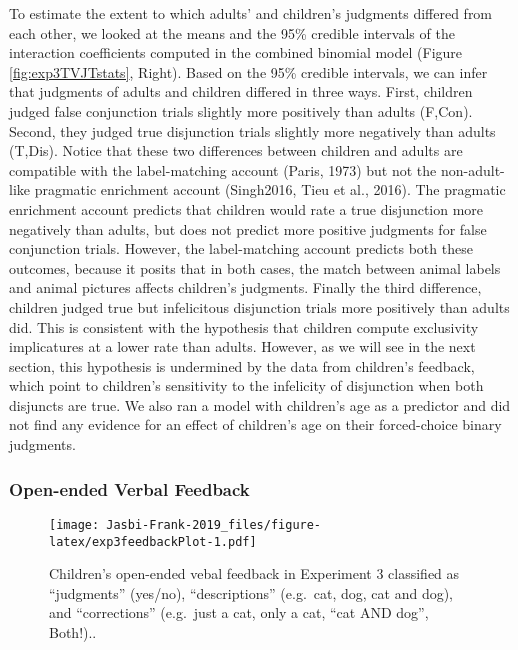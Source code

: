 \documentclass[,man,floatsintext]{apa6}
\begin{document}
To estimate the extent to which adults' and children's judgments differed from each other, we looked at the means and the 95\% credible intervals of the interaction coefficients computed in the combined binomial model (Figure \ref{fig:exp3TVJTstats}, Right). Based on the 95\% credible intervals, we can infer that judgments of adults and children differed in three ways. First, children judged false conjunction trials slightly more positively than adults (F,Con). Second, they judged true disjunction trials slightly more negatively than adults (T,Dis). Notice that these two differences between children and adults are compatible with the label-matching account (Paris, 1973) but not the non-adult-like pragmatic enrichment account (Singh2016, Tieu et al., 2016). The pragmatic enrichment account predicts that children would rate a true disjunction more negatively than adults, but does not predict more positive judgments for false conjunction trials. However, the label-matching account predicts both these outcomes, because it posits that in both cases, the match between animal labels and animal pictures affects children's judgments. Finally the third difference, children judged true but infelicitous disjunction trials more positively than adults did. This is consistent with the hypothesis that children compute exclusivity implicatures at a lower rate than adults. However, as we will see in the next section, this hypothesis is undermined by the data from children's feedback, which point to children's sensitivity to the infelicity of disjunction when both disjuncts are true. We also ran a model with children's age as a predictor and did not find any evidence for an effect of children's age on their forced-choice binary judgments.

\hypertarget{open-ended-verbal-feedback-1}{%
\subsubsection{Open-ended Verbal Feedback}\label{open-ended-verbal-feedback-1}}

\begin{figure}
\centering
\texttt{[image: Jasbi-Frank-2019\_files/figure-latex/exp3feedbackPlot-1.pdf]}
\caption{\label{fig:exp3feedbackPlot}Children's open-ended vebal feedback in Experiment 3 classified as \enquote{judgments} (yes/no), \enquote{descriptions} (e.g.~cat, dog, cat and dog), and \enquote{corrections} (e.g.~just a cat, only a cat, \enquote{cat AND dog}, Both!)..}
\end{figure}
\end{document}
